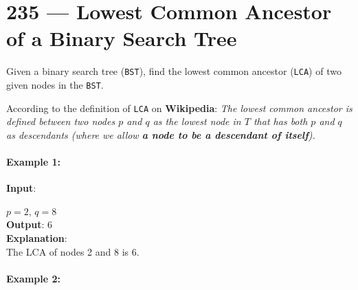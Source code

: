 \section{235 --- Lowest Common Ancestor of a Binary Search Tree}
Given a binary search tree (\texttt{BST}), find the lowest common ancestor (\texttt{LCA}) of two given nodes in the \texttt{BST}.
\par
According to the definition of \texttt{LCA} on \textbf{Wikipedia}: \textit{The lowest common ancestor is defined between two nodes $p$ and $q$ as the lowest node in $T$ that has both $p$ and $q$ as descendants (where we allow \textbf{a node to be a descendant of itself}).}

\paragraph{Example 1:}

\begin{flushleft}
\textbf{Input}: 
\begin{figure}[H]
\end{figure}
$p = 2$, $q = 8$
\\
\textbf{Output}: 6
\\
\textbf{Explanation}: 
\\
The LCA of nodes 2 and 8 is 6.
\end{flushleft}

\paragraph{Example 2:}

